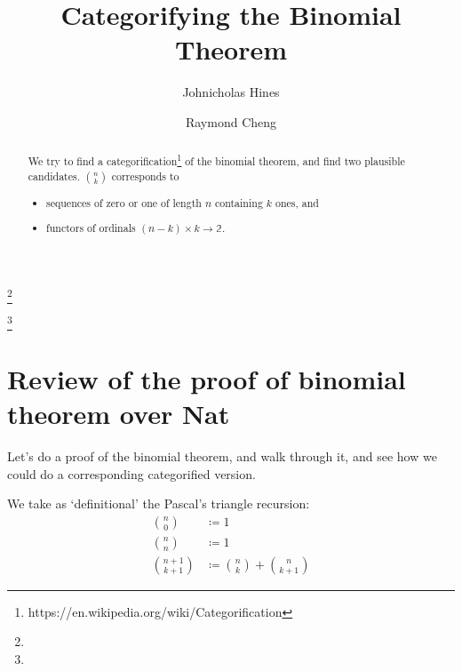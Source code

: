 \documentclass{proc-l}
\theoremstyle{definition}
\theoremstyle{remark}
\numberwithin{equation}{section}
\begin{document}
\title[Categorifying the Binomial Theorem]{Categorifying the Binomial Theorem}


\author{Johnicholas Hines}
\address{}
\curraddr{}
\email{}
\thanks{}

\author{Raymond Cheng}
\address{}
\curraddr{}
\email{}
\thanks{}


\date{}

\dedicatory{}

\commby{}

\begin{abstract}
We try to find a categorification\footnote{https://en.wikipedia.org/wiki/Categorification} of the binomial theorem,
and find two plausible candidates. \({n \choose k}\) corresponds to
\begin{itemize}
    \item sequences of zero or one of length \(n\) containing \(k\) ones, and
    \item functors of ordinals \((n-k) \times k \to \mathbb{2}\).
\end{itemize} 
\end{abstract}

\maketitle

\section{Review of the proof of binomial theorem over Nat}

Let's do a proof of the binomial theorem, and walk through it,
and see how we could do a corresponding categorified version.

We take as `definitional' the Pascal's triangle recursion:
\begin{align*}
{n \choose 0} & \coloneqq 1 \\
{n \choose n} & \coloneqq 1 \\
{n + 1 \choose k + 1} & \coloneqq {n \choose k} + {n \choose k+1}
\end{align*}
\end{document}
